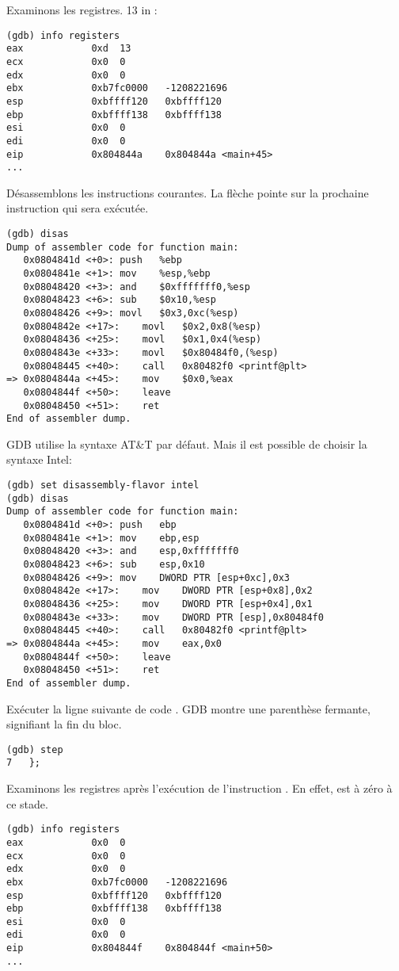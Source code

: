 Examinons les registres.
13 in \EAX:

\begin{lstlisting}
(gdb) info registers
eax            0xd	13
ecx            0x0	0
edx            0x0	0
ebx            0xb7fc0000	-1208221696
esp            0xbffff120	0xbffff120
ebp            0xbffff138	0xbffff138
esi            0x0	0
edi            0x0	0
eip            0x804844a	0x804844a <main+45>
...
\end{lstlisting}

Désassemblons les instructions courantes.
La flèche pointe sur la prochaine instruction qui sera exécutée.

\begin{lstlisting}[style=customasmx86]
(gdb) disas
Dump of assembler code for function main:
   0x0804841d <+0>:	push   %ebp
   0x0804841e <+1>:	mov    %esp,%ebp
   0x08048420 <+3>:	and    $0xfffffff0,%esp
   0x08048423 <+6>:	sub    $0x10,%esp
   0x08048426 <+9>:	movl   $0x3,0xc(%esp)
   0x0804842e <+17>:	movl   $0x2,0x8(%esp)
   0x08048436 <+25>:	movl   $0x1,0x4(%esp)
   0x0804843e <+33>:	movl   $0x80484f0,(%esp)
   0x08048445 <+40>:	call   0x80482f0 <printf@plt>
=> 0x0804844a <+45>:	mov    $0x0,%eax
   0x0804844f <+50>:	leave  
   0x08048450 <+51>:	ret    
End of assembler dump.
\end{lstlisting}

\ac{GDB} utilise la syntaxe AT\&T par défaut.
Mais il est possible de choisir la syntaxe Intel:

\begin{lstlisting}[style=customasmx86]
(gdb) set disassembly-flavor intel
(gdb) disas
Dump of assembler code for function main:
   0x0804841d <+0>:	push   ebp
   0x0804841e <+1>:	mov    ebp,esp
   0x08048420 <+3>:	and    esp,0xfffffff0
   0x08048423 <+6>:	sub    esp,0x10
   0x08048426 <+9>:	mov    DWORD PTR [esp+0xc],0x3
   0x0804842e <+17>:	mov    DWORD PTR [esp+0x8],0x2
   0x08048436 <+25>:	mov    DWORD PTR [esp+0x4],0x1
   0x0804843e <+33>:	mov    DWORD PTR [esp],0x80484f0
   0x08048445 <+40>:	call   0x80482f0 <printf@plt>
=> 0x0804844a <+45>:	mov    eax,0x0
   0x0804844f <+50>:	leave  
   0x08048450 <+51>:	ret    
End of assembler dump.
\end{lstlisting}

Exécuter la ligne suivante de code \CCpp{}.
\ac{GDB} montre une parenthèse fermante, signifiant la fin du bloc.

\begin{lstlisting}
(gdb) step
7	};
\end{lstlisting}

Examinons les registres après l'exécution de l'instruction .
En effet, \EAX est à zéro à ce stade.

\begin{lstlisting}
(gdb) info registers
eax            0x0	0
ecx            0x0	0
edx            0x0	0
ebx            0xb7fc0000	-1208221696
esp            0xbffff120	0xbffff120
ebp            0xbffff138	0xbffff138
esi            0x0	0
edi            0x0	0
eip            0x804844f	0x804844f <main+50>
...
\end{lstlisting}

